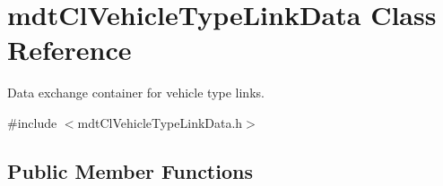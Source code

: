\hypertarget{classmdt_cl_vehicle_type_link_data}{\section{mdt\-Cl\-Vehicle\-Type\-Link\-Data Class Reference}
\label{classmdt_cl_vehicle_type_link_data}
}


Data exchange container for vehicle type links.  




{\ttfamily \#include $<$mdt\-Cl\-Vehicle\-Type\-Link\-Data.\-h$>$}

\subsection*{Public Member Functions}
